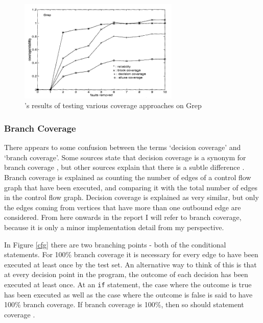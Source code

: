 \begin{figure}
\begin{minipage}{0.1\textwidth}
\hspace{1.00mm}
\end{minipage}
\begin{minipage}[b]{0.49\textwidth}
\centering
\includegraphics[width=3in]{figures/coverage_reliability.png}
\caption{\citet{497650}'s results of testing various coverage approaches on Grep}
\label{coverageReliability}
\end{minipage}
\end{figure}

\subsubsection{Branch Coverage}

There appears to some confusion between the terms `decision coverage' and `branch coverage'. Some sources state that decision coverage is a synonym for branch coverage \citep{softwareTestingBranchDecision, hitexBranchDecision}, but other sources explain that there is a subtle difference \citep{tmgBranchDecision, bullsEyeBranchDecision}. Branch coverage is explained as counting the number of edges of a control flow graph that have been executed, and comparing it with the total number of edges in the control flow graph. Decision coverage is explained as very similar, but only the edges coming from vertices that have more than one outbound edge are considered. From here onwards in the report I will refer to branch coverage, because it is only a minor implementation detail from my perspective.

In Figure \ref{cfg} there are two branching points - both of the conditional statements. For 100\% branch coverage it is necessary for every edge to have been executed at least once by the test set. An alternative way to think of this is that at every decision point in the program, the outcome of each decision has been executed at least once. At an \verb+if+ statement, the case where the outcome is true has been executed as well as the case where the outcome is false is said to have 100\% branch coverage. If branch coverage is 100\%, then so should statement coverage \citep{Myers:2004:AST:983238}.

